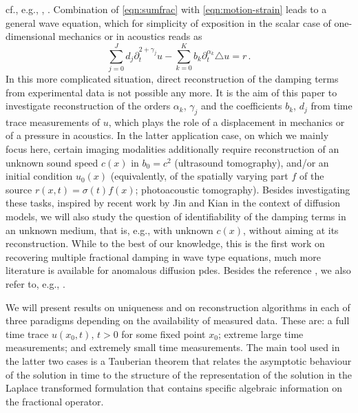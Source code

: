 cf., e.g., \cite[section 3.1.1]{Atanackovic_etal:2014}, \cite{bagley1986fractional,schmidt2002finite}.
Combination of \eqref{eqn:sumfrac} with \eqref{eqn:motion-strain} leads to a general wave equation, which  
for simplicity of exposition in the scalar case of one-dimensional mechanics or in acoustics reads as 
\[
\sum_{j=0}^J d_j \partial_t^{2+\gamma_j} u - \sum_{k=0}^K b_k \partial_t^{\alpha_k} \triangle u = r\,.
\]
In this more complicated situation, direct reconstruction of the damping terms from experimental data is not possible any more. It is the aim of this paper to investigate reconstruction of the orders $\alpha_k$, $\gamma_j$ and the coefficients $b_k$, $d_j$ from time trace measurements of $u$, which plays the role of a displacement in mechanics or of a pressure in acoustics.
In the latter application case, on which we mainly focus here, certain imaging modalities additionally require  reconstruction of an unknown sound speed $c(x)$ in $b_0=c^2$ (ultrasound tomography), and/or an initial condition $u_0(x)$ (equivalently, of the spatially varying part $f$ of the source $r(x,t)=\sigma(t)f(x)$; photoacoustic tomography).
Besides investigating these tasks, inspired by recent work by Jin and Kian \cite{JinKian:2021} in the context of diffusion models, we will also study the question of identifiability of the damping terms in an unknown medium, that is, e.g., with unknown $c(x)$, without aiming at its reconstruction. 
While to the best of our knowledge, this is the first work on recovering
multiple fractional damping in wave type equations, much more literature is
available for anomalous diffusion {\sc pde}s.
Besides the reference \cite{JinKian:2021},
we also refer to, e.g.,
\cite{HatanoNakagawaWangYamamoto:2013,LiYamamoto:2015,LiZhangJiaYamamoto:2013,Yamamoto:2021,SunLiZhang:2021}.

We will present results on uniqueness and on reconstruction algorithms in
each of three paradigms depending on the availability of measured data.
These are:  a full time trace $u(x_0,t)$, $t >0$ for some fixed point $x_0$;
extreme large time measurements; and extremely small time measurements.
The main tool used in the latter two cases is a Tauberian theorem that
relates the asymptotic behaviour of the solution in time to the structure
of the representation of the solution in the Laplace transformed formulation
that contains specific algebraic information on the fractional operator.


